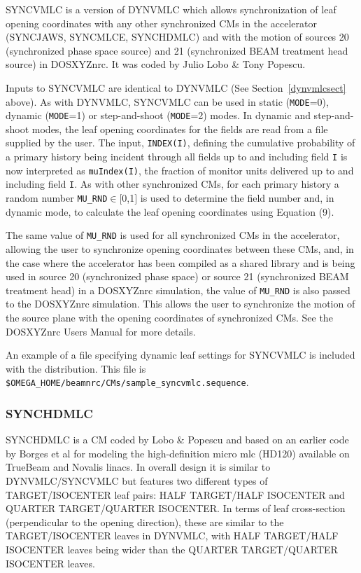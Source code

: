 \documentclass[12pt,twoside]{article}
\begin{document}
SYNCVMLC is a version of DYNVMLC which allows synchronization of leaf opening
coordinates with any other synchronized CMs in the accelerator (SYNCJAWS, SYNCMLCE,
SYNCHDMLC) and with the motion of sources 20 (synchronized phase space source) and
21 (synchronized BEAM treatment head source) in DOSXYZnrc.  It was coded by Julio Lobo \&
Tony Popescu\cite{LP10}.

Inputs to SYNCVMLC are identical to DYNVMLC (See Section~\ref{dynvmlcsect} above).
As with DYNVMLC, SYNCVMLC can be used in static ({\tt MODE}=0), dynamic ({\tt MODE}=1)
or step-and-shoot ({\tt MODE}=2) modes.  In dynamic and step-and-shoot modes, the leaf
opening coordinates for the fields are read from a file supplied by the user.  The
input, {\tt INDEX(I)}, defining the cumulative probability of a primary history
being incident through all fields up to and including field {\tt I} is now interpreted as {\tt muIndex(I)}, the
fraction of monitor units delivered up to and including field {\tt I}.  As with other
synchronized CMs, for each primary history a random number {\tt MU\_RND}$\in[$0,1$]$ is
used to determine the field number and, in dynamic mode, to calculate the leaf
opening coordinates using Equation (9).

The same value of {\tt MU\_RND} is used for all synchronized CMs in the accelerator, allowing
the user to synchronize opening coordinates between these CMs, and, in the case where the
accelerator has been compiled as a shared library and is being used in source 20 (synchronized
phase space) or source 21 (synchronized BEAM treatment head) in a DOSXYZnrc simulation, the
value of {\tt MU\_RND} is also passed to the DOSXYZnrc simulation.  This allows the user
to synchronize the motion of the source plane with the opening coordinates of synchronized
CMs.  See the DOSXYZnrc Users Manual\cite{Wa05} for more details.

An example of a file specifying dynamic leaf settings for SYNCVMLC
is included with the distribution.  This file is {\tt \$OMEGA\_HOME/beamnrc/CMs/sample\_syncvmlc.sequence}.

\clearpage
\renewcommand{\rightmark}{SYNCHDMLC CM}
\subsubsection{SYNCHDMLC}
\label{synchdmlcsect}

SYNCHDMLC is a CM coded by Lobo \& Popescu and based on an earlier code by Borges et al\cite{Bo12} for
modeling the high-definition micro mlc (HD120) available on TrueBeam and Novalis linacs.  In overall
design it is similar to DYNVMLC/SYNCVMLC but features two different types of TARGET/ISOCENTER leaf pairs:
HALF TARGET/HALF ISOCENTER and QUARTER TARGET/QUARTER ISOCENTER.  In terms of leaf cross-section
(perpendicular to the opening direction), these are
similar to the TARGET/ISOCENTER leaves in DYNVMLC, with HALF TARGET/HALF ISOCENTER leaves being
wider than the QUARTER TARGET/QUARTER ISOCENTER leaves.
\end{document}
